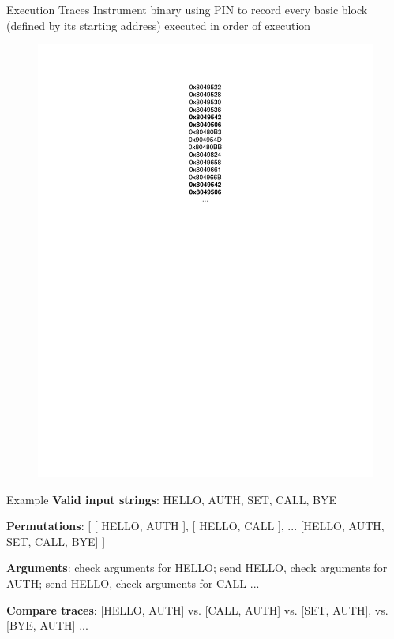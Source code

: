 \documentclass[pdf]{beamer}
\begin{document}
\begin{frame}{Execution Traces}
Instrument binary using PIN to record every basic block (defined by its starting address) executed in order of execution
\begin{figure}
\begin{center}
\includegraphics[scale=0.5]{../paper/traceexample.pdf}
\end{center}
\end{figure}
\end{frame}

\begin{frame}{Example}
\textbf{Valid input strings}: HELLO, AUTH, SET, CALL, BYE

\pause
\vspace{\baselineskip}

\textbf{Permutations}: [ [ HELLO, AUTH ], [ HELLO, CALL ], ... [HELLO, AUTH, SET, CALL, BYE] ]

\pause
\vspace{\baselineskip}

\textbf{Arguments}: check arguments for HELLO; send HELLO, check arguments for AUTH; send HELLO, check arguments for CALL ...

\pause
\vspace{\baselineskip}

\textbf{Compare traces}: [HELLO, AUTH] vs. [CALL, AUTH] vs. [SET, AUTH], vs. [BYE, AUTH] ... 

\end{frame}
\end{document}
